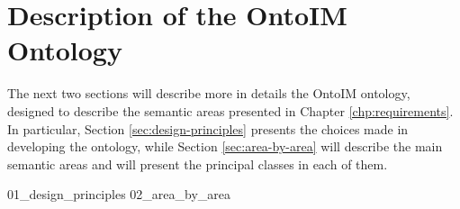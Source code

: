 \chapter{Description of the OntoIM Ontology}
\label{chp:ontoim-description}

The next two sections will describe more in details the \ac{OntoIM} ontology, designed to describe the semantic areas presented in Chapter \ref{chp:requirements}. In particular, Section \ref{sec:design-principles} presents the choices made in developing the ontology, while Section \ref{sec:area-by-area} will describe the main semantic areas and will present the principal classes in each of them.

{01_design_principles}%
{02_area_by_area}%
